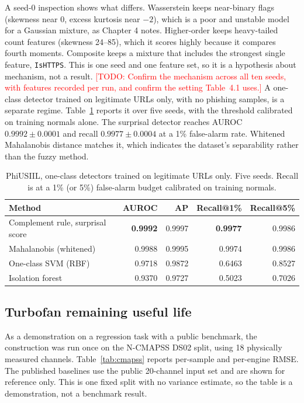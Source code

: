 \documentclass[journal]{IEEEtran}
\newcommand{\todo}[1]{\textcolor{red}{[TODO: #1]}}
\begin{document}
A seed-0 inspection shows what differs. Wasserstein keeps near-binary flags (skewness near 0, excess kurtosis near $-2$), which is a poor and unstable model for a Gaussian mixture, as Chapter 4 notes. Higher-order keeps heavy-tailed count features (skewness 24--85), which it scores highly because it compares fourth moments. Composite keeps a mixture that includes the strongest single feature, \texttt{IsHTTPS}. This is one seed and one feature set, so it is a hypothesis about mechanism, not a result. \todo{Confirm the mechanism across all ten seeds, with features recorded per run, and confirm the setting Table~4.1 uses.} A one-class detector trained on legitimate URLs only, with no phishing samples, is a separate regime. Table~\ref{tab:phi1c} reports it over five seeds, with the threshold calibrated on training normals alone. The surprisal detector reaches AUROC $0.9992 \pm 0.0001$ and recall $0.9977 \pm 0.0004$ at a 1\% false-alarm rate. Whitened Mahalanobis distance matches it, which indicates the dataset's separability rather than the fuzzy method.

\begin{table}[t]
\centering
\caption{PhiUSIIL, one-class detectors trained on legitimate URLs only. Five seeds. Recall is at a 1\% (or 5\%) false-alarm budget calibrated on training normals.}
\label{tab:phi1c}
\begin{tabular}{lrrrr}
\toprule
Method & AUROC & AP & Recall@1\% & Recall@5\% \\
\midrule
Complement rule, surprisal score & \textbf{0.9992} & 0.9997 & \textbf{0.9977} & 0.9986 \\
Mahalanobis (whitened) & 0.9988 & 0.9995 & 0.9974 & 0.9986 \\
One-class SVM (RBF) & 0.9718 & 0.9872 & 0.6463 & 0.8527 \\
Isolation forest & 0.9370 & 0.9727 & 0.5023 & 0.7026 \\
\bottomrule
\end{tabular}
\end{table}

\subsection{Turbofan remaining useful life}
As a demonstration on a regression task with a public benchmark, the construction was run once on the N-CMAPSS DS02 split, using 18 physically measured channels. Table~\ref{tab:cmapss} reports per-sample and per-engine RMSE. The published baselines use the public 20-channel input set and are shown for reference only. This is one fixed split with no variance estimate, so the table is a demonstration, not a benchmark result.
\end{document}
